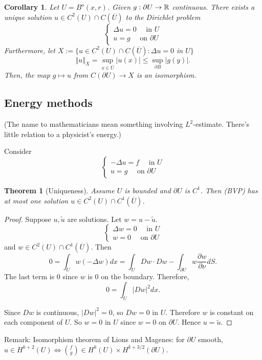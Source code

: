 \documentclass[11pt]{amsart}%
\newtheorem{theorem}{Theorem}
\newtheorem{corollary}{Corollary}
\begin{document}
\begin{corollary}
    Let $U=B^o(x,r)$. Given $g:\partial U\to \mathbb{R}$ continuous. There exists a unique solution $u\in C^2(U)\cap C(\overline{U})$ to the Dirichlet problem
    $$\begin{cases}
    \Delta u =0 \quad \text{ in } U\\
    u=g \quad \text{ on } \partial U
\end{cases}$$
Furthermore, let $X:=\{ u\in C^2(U)\cap C(\overline{U}): \Delta u=0$ in $U\}$
$$\Vert u\Vert_X =\sup_{x\in \overline{U}}\vert u(x)\vert \le\sup_{\partial B} \vert g(y)\vert.$$
Then, the map $g\mapsto u$ from $C(\partial U)\to X$ is an isomorphism.
\end{corollary}

\subsection*{Energy methods}
(The name to mathematicians mean something involving $L^2$-estimate. There's little relation to a physicist's energy.)

Consider
\[\begin{cases}
    -\Delta u =f \quad \text{ in } U\\
    u=g \quad \text{ on } \partial U
\end{cases}\tag{BVP}\]

\begin{theorem}[Uniqueness]
    Assume $U$ is bounded and $\partial U$ is $C^1$. Then (BVP) has at most one solution $u\in C^2(U)\cap C^1(\overline{U})$.
\end{theorem}

\begin{proof}
    Suppose $u, \tilde{u}$ are solutions. Let $w=u-\tilde{u}$.
    $$\begin{cases}
        \Delta w =0 \quad \text{ in } U\\
        w =0 \quad \text{ on } \partial U
    \end{cases}$$ 
    and $w\in C^2(U)\cap C^1(\overline{U})$. Then
    $$0=\int_U w(-\Delta w) dx =\int_U Dw\cdot Dw - \int_{\partial U} w\frac{\partial w}{\partial \nu} dS.$$ The last term is $0$ since $w$ is 0 on the boundary. Therefore,
    $$0 = \int_U \vert Dw\vert^2 dx.$$
    
    Since $Dw$ is continuous, $\vert Dw\vert^2 =0$, so $Dw=0$ in $U$. Therefore $w$ is constant on each component of $U$. So $w=0$ in $U$ since $w=0$ on $\partial U$. Hence $u=\tilde{u}$.
\end{proof}

Remark: Isomorphism theorem of Lions and Magenes: for $\partial U$ smooth, $u\in H^{k+2}(U)\iff \binom{f}{g}\in H^k(U)\times H^{k+3/2}(\partial U)$.
\end{document}
